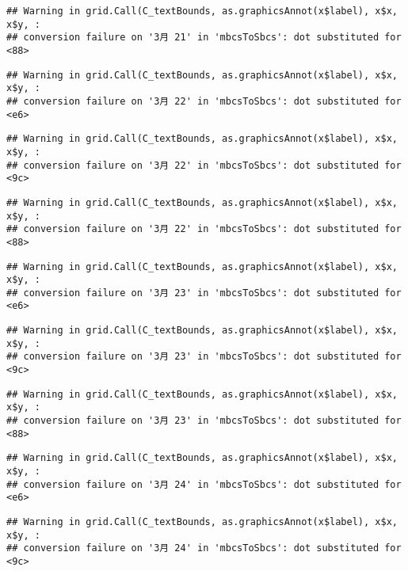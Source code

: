 \documentclass[
]{article}
\begin{document}
\begin{verbatim}
## Warning in grid.Call(C_textBounds, as.graphicsAnnot(x$label), x$x, x$y, :
## conversion failure on '3月 21' in 'mbcsToSbcs': dot substituted for <88>
\end{verbatim}

\begin{verbatim}
## Warning in grid.Call(C_textBounds, as.graphicsAnnot(x$label), x$x, x$y, :
## conversion failure on '3月 22' in 'mbcsToSbcs': dot substituted for <e6>
\end{verbatim}

\begin{verbatim}
## Warning in grid.Call(C_textBounds, as.graphicsAnnot(x$label), x$x, x$y, :
## conversion failure on '3月 22' in 'mbcsToSbcs': dot substituted for <9c>
\end{verbatim}

\begin{verbatim}
## Warning in grid.Call(C_textBounds, as.graphicsAnnot(x$label), x$x, x$y, :
## conversion failure on '3月 22' in 'mbcsToSbcs': dot substituted for <88>
\end{verbatim}

\begin{verbatim}
## Warning in grid.Call(C_textBounds, as.graphicsAnnot(x$label), x$x, x$y, :
## conversion failure on '3月 23' in 'mbcsToSbcs': dot substituted for <e6>
\end{verbatim}

\begin{verbatim}
## Warning in grid.Call(C_textBounds, as.graphicsAnnot(x$label), x$x, x$y, :
## conversion failure on '3月 23' in 'mbcsToSbcs': dot substituted for <9c>
\end{verbatim}

\begin{verbatim}
## Warning in grid.Call(C_textBounds, as.graphicsAnnot(x$label), x$x, x$y, :
## conversion failure on '3月 23' in 'mbcsToSbcs': dot substituted for <88>
\end{verbatim}

\begin{verbatim}
## Warning in grid.Call(C_textBounds, as.graphicsAnnot(x$label), x$x, x$y, :
## conversion failure on '3月 24' in 'mbcsToSbcs': dot substituted for <e6>
\end{verbatim}

\begin{verbatim}
## Warning in grid.Call(C_textBounds, as.graphicsAnnot(x$label), x$x, x$y, :
## conversion failure on '3月 24' in 'mbcsToSbcs': dot substituted for <9c>
\end{verbatim}
\end{document}
